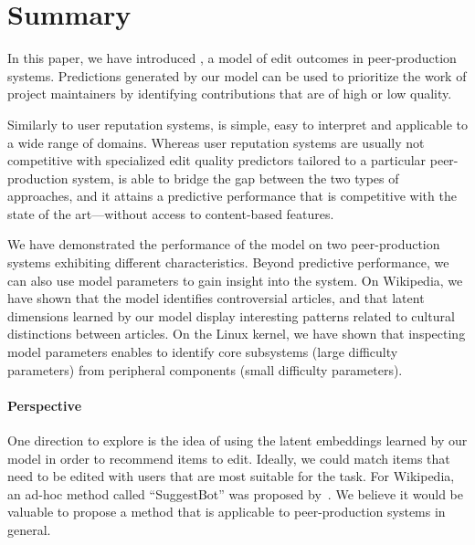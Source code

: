 \section{Summary}
\label{pps:sec:conclusion}

In this paper, we have introduced \interank{}, a model of edit outcomes in peer-production systems.
Predictions generated by our model can be used to prioritize the work of project maintainers by identifying contributions that are of high or low quality.

Similarly to user reputation systems, \interank{} is simple, easy to interpret and applicable to a wide range of domains.
Whereas user reputation systems are usually not competitive with specialized edit quality predictors tailored to a particular peer-production system, \interank{} is able to bridge the gap between the two types of approaches, and it attains a predictive performance that is competitive with the state of the art---without access to content-based features.

We have demonstrated the performance of the model on two peer-production systems exhibiting different characteristics.
Beyond predictive performance, we can also use model parameters to gain insight into the system.
On Wikipedia, we have shown that the model identifies controversial articles, and that latent dimensions learned by our model display interesting patterns related to cultural distinctions between articles.
On the Linux kernel, we have shown that inspecting model parameters enables to identify core subsystems (large difficulty parameters) from peripheral components (small difficulty parameters).

\paragraph{Perspective}
One direction to explore is the idea of using the latent embeddings learned by our model in order to recommend items to edit.
Ideally, we could match items that need to be edited with users that are most suitable for the task.
For Wikipedia, an ad-hoc method called ``SuggestBot'' was proposed by~\citet{cosley2007suggestbot}.
We believe it would be valuable to propose a method that is applicable to peer-production systems in general.
